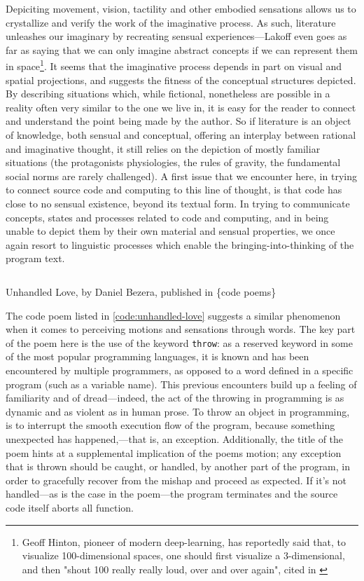 Depiciting movement, vision, tactility and other embodied sensations allows us to crystallize and verify the work of the imaginative process. As such, literature unleashes our imaginary by recreating sensual experiences—Lakoff even goes as far as saying that we can only imagine abstract concepts if we can represent them in space\footnote{Geoff Hinton, pioneer of modern deep-learning, has reportedly said that, to visualize 100-dimensional spaces, one should first visualize a 3-dimensional, and then "shout 100 really really loud, over and over again", cited in \citep{akten_journey_2016}}. It seems that the imaginative process depends in part on visual and spatial projections, and suggests the fitness of the conceptual structures depicted. By describing situations which, while fictional, nonetheless are possible in a reality often very similar to the one we live in, it is easy for the reader to connect and understand the point being made by the author. So if literature is an object of knowledge, both sensual and conceptual, offering an interplay between rational and imaginative thought, it still relies on the depiction of mostly familiar situations (the protagonists physiologies, the rules of gravity, the fundamental social norms are rarely challenged). A first issue that we encounter here, in trying to connect source code and computing to this line of thought, is that code has close to no sensual existence, beyond its textual form. In trying to communicate concepts, states and processes related to code and computing, and in being unable to depict them by their own material and sensual properties, we once again resort to linguistic processes which enable the bringing-into-thinking of the program text.

\begin{listing}
    \inputminted[]{java}{./corpus/unhandled_love.java}
    \caption{Unhandled Love, by Daniel Bezera, published in \{code poems\} \citep{bertram_code_2012}}
    \label{code:unhandled-love}
\end{listing}

The code poem listed in \ref{code:unhandled-love} suggests a similar phenomenon when it comes to perceiving motions and sensations through words. The key part of the poem here is the use of the keyword \lstinline{throw}: as a reserved keyword in some of the most popular programming languages, it is known and has been encountered by multiple programmers, as opposed to a word defined in a specific program (such as a variable name). This previous encounters build up a feeling of familiarity and of dread—indeed, the act of the throwing in programming is as dynamic and as violent as in human prose. To throw an object in programming, is to interrupt the smooth execution flow of the program, because something unexpected has happened,—that is, an exception. Additionally, the title of the poem hints at a supplemental implication of the poems motion; any exception that is thrown should be caught, or handled, by another part of the program, in order to gracefully recover from the mishap and proceed as expected. If it's not handled—as is the case in the poem—the program terminates and the source code itself aborts all function.

